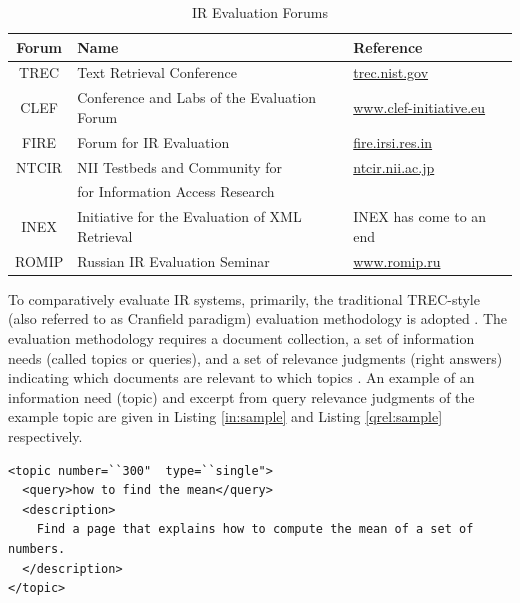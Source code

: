 \begin{table}
\caption{IR Evaluation Forums}
\label{tbl:forums}
\centering
\begin{tabular}{| c | l | l |}
\hline 
 \bfseries Forum &  \bfseries Name & \bfseries Reference  \\
\hline 
TREC & Text Retrieval Conference & \url{trec.nist.gov} \\
CLEF & Conference and Labs of the Evaluation Forum & \url{www.clef-initiative.eu} \\
FIRE & Forum for IR Evaluation & \url{fire.irsi.res.in} \\
NTCIR & NII Testbeds and Community for  & \url{ntcir.nii.ac.jp} \\
           &  for Information Access Research &  \\
INEX & Initiative for the Evaluation of XML Retrieval & INEX has come to an end  \\
ROMIP & Russian IR Evaluation Seminar & \url{www.romip.ru} \\
\hline
\end{tabular}
\end{table}

To comparatively evaluate IR systems, primarily, the traditional TREC-style (also referred to as Cranfield paradigm) evaluation methodology is adopted \citep{trec}.
The evaluation methodology requires a document collection, a set of information needs (called topics or queries), and a set of relevance judgments (right answers) indicating which documents are relevant to which topics \citep{cranfield}.
An example of an information need (topic) and excerpt from query relevance judgments of the example topic are given in Listing \ref{in:sample} and Listing \ref{qrel:sample} respectively.
\\
\begin{lstlisting}
<topic number=``300"  type=``single">
  <query>how to find the mean</query>
  <description>
  	Find a page that explains how to compute the mean of a set of numbers.
  </description> 
</topic>
\end{lstlisting}



